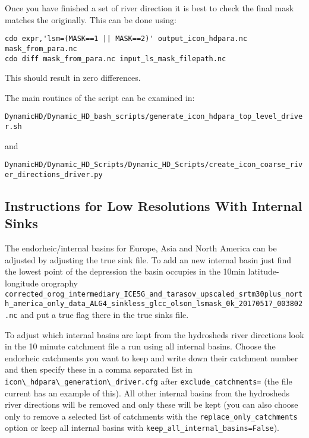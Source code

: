 \documentclass{article}
\begin{document}
Once you have finished a set of river direction it is best to check the final mask matches the originally. This can be done using:
\begin{lstlisting}[style=bash_input,breaklines=true]
cdo expr,'lsm=(MASK==1 || MASK==2)' output_icon_hdpara.nc mask_from_para.nc
cdo diff mask_from_para.nc input_ls_mask_filepath.nc
\end{lstlisting} 
This should result in zero differences.

The main routines of the script can be examined in:

\lstinline[style=bash_input]{DynamicHD/Dynamic_HD_bash_scripts/generate_icon_hdpara_top_level_driver.sh}

and 

\lstinline[style=bash_input]{DynamicHD/Dynamic_HD_Scripts/Dynamic_HD_Scripts/create_icon_coarse_river_directions_driver.py}


\subsection{Instructions for Low Resolutions With Internal Sinks}

The endorheic/internal basins for Europe, Asia and North America can be adjusted by adjusting the true sink file. To add an new internal basin just find the lowest point of the depression the basin occupies in the 10min latitude-longitude orography \lstinline[style=bash_input]{corrected_orog_intermediary_ICE5G_and_tarasov_upscaled_srtm30plus_north_america_only_data_ALG4_sinkless_glcc_olson_lsmask_0k_20170517_003802.nc} and put a true flag there in the true sinks file.

To adjust which internal basins are kept from the hydrosheds river directions look in the 10 minute catchment file a run using all internal basins.  Choose the endorheic  catchments you want to keep and write down their catchment number and then specify these in a comma separated list in \lstinline[style=bash_input]{icon\_hdpara\_generation\_driver.cfg} after \lstinline[style=bash_input]{exclude_catchments=} (the file current has an example of this). All other internal basins from the hydrosheds river directions will be removed and only these will be kept (you can also choose only to remove a selected list of catchments with the \lstinline[style=bash_input]{replace_only_catchments} option or keep all internal basins with \lstinline[style=bash_input]{keep_all_internal_basins=False}).  
\end{document}
